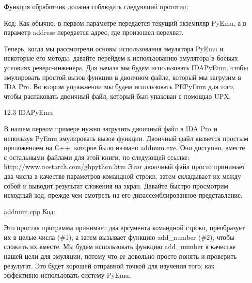 \documentclass[12pt]{book}
\begin{document}
Функция обработчик должна соблюдать следующий прототип:

Код:
Как обычно, в первом параметре передается текущий экземпляр PyEmu, а в параметр address передается адрес, где произошел перехват.

Теперь, когда мы рассмотрели основы использования эмулятора PyEmu и некоторые его методы, давайте перейдем к использованию эмулятора в боевых условиях реверс-инженера. Для начала мы будем использовать IDAPyEmu, чтобы эмулировать простой вызов функции в двоичном файле, который мы загрузим в IDA Pro. Во втором упражнении мы будем использовать PEPyEmu для того, чтобы распаковать двоичный файл, который был упакован с помощью UPX.


12.3 IDAPyEmu

В нашем первом примере нужно загрузить двоичный файл в IDA Pro и используя PyEmu эмулировать вызов функции. Двоичный файл является простым приложением на C++, которое было названо addnum.exe. Оно доступно, вместе с остальными файлами для этой книги, по следующей ссылке:
http://www.nostarch.com/ghpython.htm
Этот двоичный файл просто принимает два числа в качестве параметров командной строки, затем складывает их между собой и выводит результат сложения на экран. Давайте быстро просмотрим исходный код, прежде чем смотреть на его дизассемблированное представление.

addnum.cpp
Код:


    

    


Это простая программа принимает два аргумента командной строки, преобразует их в целые числа (\#1), а затем вызывает функцию add\_number (\#2), чтобы сложить их вместе. Мы будем использовать функцию add\_number в качестве нашей цели для эмуляции, потому что ее довольно просто понять и проверить результат. Это будет хорошей отправной точкой для изучения того, как эффективно использовать систему PyEmu.
\end{document}
